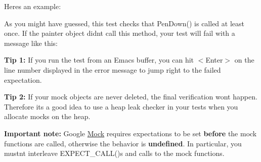 Here\textquotesingle{}s an example\+:


\begin{DoxyCode}{0}
\DoxyCodeLine{}
\DoxyCodeLine{}
\DoxyCodeLine{}
\DoxyCodeLine{}
\DoxyCodeLine{\}}
\end{DoxyCode}


As you might have guessed, this test checks that {\ttfamily Pen\+Down()} is called at least once. If the {\ttfamily painter} object didn\textquotesingle{}t call this method, your test will fail with a message like this\+:


\begin{DoxyCode}{0}
\end{DoxyCode}


{\bfseries{Tip 1\+:}} If you run the test from an Emacs buffer, you can hit {\ttfamily $<$Enter$>$} on the line number displayed in the error message to jump right to the failed expectation.

{\bfseries{Tip 2\+:}} If your mock objects are never deleted, the final verification won\textquotesingle{}t happen. Therefore it\textquotesingle{}s a good idea to use a heap leak checker in your tests when you allocate mocks on the heap.

{\bfseries{Important note\+:}} Google \mbox{\hyperlink{class_mock}{Mock}} requires expectations to be set {\bfseries{before}} the mock functions are called, otherwise the behavior is {\bfseries{undefined}}. In particular, you mustn\textquotesingle{}t interleave {\ttfamily E\+X\+P\+E\+C\+T\+\_\+\+C\+A\+L\+L()}s and calls to the mock functions.

